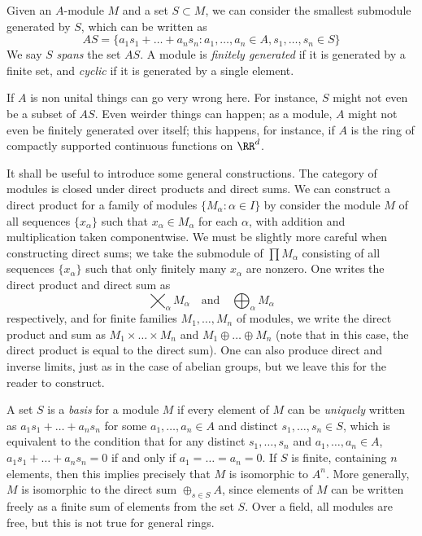 Given an $A$-module $M$ and a set $S \subset M$, we can consider the smallest submodule generated by $S$, which can be written as
%
\[ AS = \{ a_1s_1 + \dots + a_ns_n : a_1, \dots, a_n \in A, s_1, \dots, s_n \in S \} \]
%
We say $S$ \emph{spans} the set $AS$. A module is \emph{finitely generated} if it is generated by a finite set, and \emph{cyclic} if it is generated by a single element.

\begin{remark}
    If $A$ is non unital things can go very wrong here. For instance, $S$ might not even be a subset of $AS$. Even weirder things can happen; as a module, $A$ might not even be finitely generated over itself; this happens, for instance, if $A$ is the ring of compactly supported continuous functions on $\RR^d$.
\end{remark}

It shall be useful to introduce some general constructions. The category of modules is closed under direct products and direct sums. We can construct a direct product for a family of modules $\{ M_\alpha : \alpha \in I \}$ by consider the module $M$ of all sequences $\{ x_\alpha \}$ such that $x_\alpha \in M_\alpha$ for each $\alpha$, with addition and multiplication taken componentwise. We must be slightly more careful when constructing direct sums; we take the submodule of $\prod M_\alpha$ consisting of all sequences $\{ x_\alpha \}$ such that only finitely many $x_\alpha$ are nonzero. One writes the direct product and direct sum as
%
\[ \bigtimes_\alpha M_\alpha\quad\text{and}\quad \bigoplus_\alpha M_\alpha \]
%
respectively, and for finite families $M_1, \dots, M_n$ of modules, we write the direct product and sum as $M_1 \times \dots \times M_n$ and $M_1 \oplus \dots \oplus M_n$ (note that in this case, the direct product is equal to the direct sum). One can also produce direct and inverse limits, just as in the case of abelian groups, but we leave this for the reader to construct.

A set $S$ is a \emph{basis} for a module $M$ if every element of $M$ can be \emph{uniquely} written as $a_1s_1 + \dots + a_ns_n$ for some $a_1, \dots, a_n \in A$ and distinct $s_1, \dots, s_n \in S$, which is equivalent to the condition that for any distinct $s_1,\dots, s_n$ and $a_1,\dots,a_n \in A$, $a_1s_1 + \dots + a_ns_n = 0$ if and only if $a_1 = \dots = a_n = 0$. If $S$ is finite, containing $n$ elements, then this implies precisely that $M$ is isomorphic to $A^n$. More generally, $M$ is isomorphic to the direct sum $\oplus_{s \in S} A$, since elements of $M$ can be written freely as a finite sum of elements from the set $S$. Over a field, all modules are free, but this is not true for general rings.

